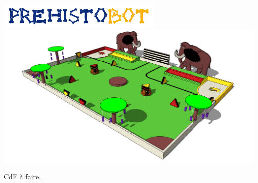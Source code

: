 \begin{frame}
   \begin{center}
      \includegraphics[width=0.6\textwidth]{../images/prehistobot.png}\\
      \includegraphics[width=\textwidth]{../images/table.png}
   \end{center}
\end{frame}

\begin{frame}
    CdF à faire.
\end{frame}
